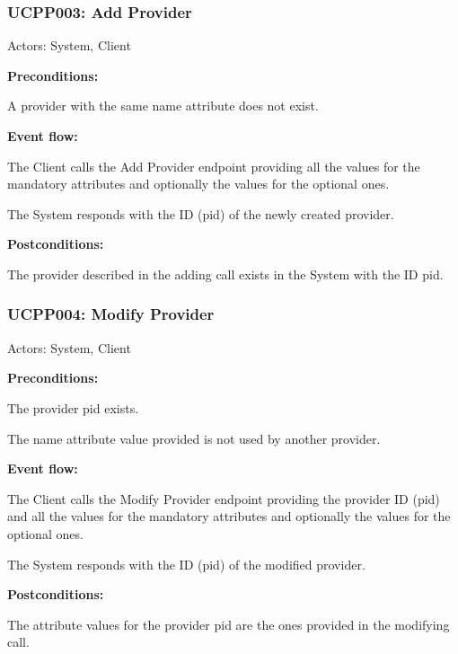 \begin{ucbox}{\subsubsection{UCPP003: Add Provider}}
\label{UCPP003}

Actors: System, Client

\textbf{Preconditions:}

\ucitem A provider with the same name attribute does not exist.

\textbf{Event flow:}

\ucitem The Client calls the Add Provider endpoint providing all the values for the mandatory attributes and optionally the values for the optional ones.

\ucitem The System responds with the ID (pid) of the newly created provider.

\textbf{Postconditions:}

\ucitem The provider described in the adding call exists in the System with the ID pid.

\end{ucbox}

\begin{ucbox}{\subsubsection{UCPP004: Modify Provider}}
\label{UCPP004}

Actors: System, Client

\textbf{Preconditions:}

\ucitem The provider pid exists.

\ucitem The name attribute value provided is not used by another provider.

\textbf{Event flow:}

\ucitem The Client calls the Modify Provider endpoint providing the provider ID (pid) and all the values for the mandatory attributes and optionally the values for the optional 
ones.

\ucitem The System responds with the ID (pid) of the modified provider.

\textbf{Postconditions:}

\ucitem The attribute values for the provider pid are the ones provided in the modifying call.

\end{ucbox}

